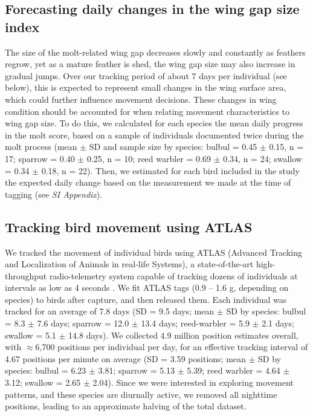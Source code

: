 \begin{refsection}
\subsection*{Forecasting daily changes in the wing gap size index}

The size of the molt-related wing gap decreases slowly and constantly as feathers regrow, yet as a mature feather is shed, the wing gap size may also increase in gradual jumps.
Over our tracking period of about 7 days per individual (see below), this is expected to represent small changes in the wing surface area, which could further influence movement decisions.
These changes in wing condition should be accounted for when relating movement characteristics to wing gap size.
To do this, we calculated for each species the mean daily progress in the molt score, based on a sample of individuals documented twice during the molt process (mean $\pm$ SD and sample size by species: bulbul = 0.45 $\pm$ 0.15, n = 17; sparrow = 0.40 $\pm$ 0.25, n = 10; reed warbler = 0.69 $\pm$ 0.34, n = 24; swallow = 0.34 $\pm$ 0.18, n = 22). 
Then, we estimated for each bird included in the study the expected daily change based on the measurement we made at the time of tagging (see \textit{SI Appendix}).

\subsection*{Tracking bird movement using ATLAS}

We tracked the movement of individual birds using ATLAS (Advanced Tracking and Localization of Animals in real-life Systems), a state-of-the-art high-throughput radio-telemetry system capable of tracking dozens of individuals at intervals as low as 4 seconds \citep{weiser2016,toledo2014,toledo2020,nathan2022}.
We fit ATLAS tags (0.9 -- 1.6 g, depending on species) to birds after capture, and then released them.
Each individual was tracked for an average of 7.8 days (SD = 9.5 days; mean $\pm$ SD by species:  bulbul = 8.3 $\pm$ 7.6 days; sparrow = 12.0 $\pm$ 13.4 days; reed-warbler = 5.9 $\pm$ 2.1 days; swallow = 5.1 $\pm$ 14.8 days).
We collected 4.9 million position estimates overall, with $\approx$6,700 positions per individual per day, for an effective tracking interval of 4.67 positions per minute on average (SD = 3.59 positions; mean $\pm$ SD by species:  bulbul = 6.23 $\pm$ 3.81; sparrow = 5.13 $\pm$ 5.39; reed warbler = 4.64 $\pm$ 3.12; swallow = 2.65 $\pm$ 2.04).
Since we were interested in exploring movement patterns, and these species are diurnally active, we removed all nighttime positions, leading to an approximate halving of the total dataset.


\end{refsection}
